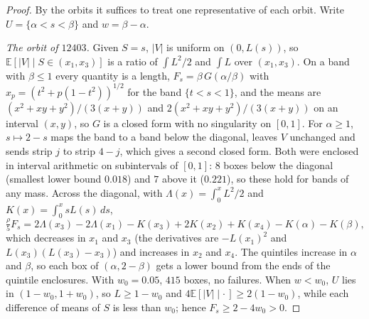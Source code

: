 \documentclass[11pt]{amsart}
\theoremstyle{definition}
\theoremstyle{remark}
\numberwithin{equation}{section}
\newcommand{\E}{\mathbb{E}}
\begin{document}
\begin{proof}
By the orbits it suffices to treat one representative of each orbit. Write $U=\{\alpha<s<\beta\}$ and $w=\beta-\alpha$.

\emph{The orbit of $12403$.} Given $S=s$, $|V|$ is uniform on $(0,L(s))$, so
$\E[|V|\mid S\in(x_1,x_3)]$ is a ratio of $\int L^2/2$ and $\int L$ over $(x_1,x_3)$. On a band with $\beta\le1$ every
quantity is a length, $F_s=\beta\,G(\alpha/\beta)$ with $x_p=(t^2+p(1-t^2))^{1/2}$ for the band $\{t<s<1\}$, and the means
are $(x^2+xy+y^2)/(3(x+y))$ and $2(x^2+xy+y^2)/(3(x+y))$ on an interval $(x,y)$, so $G$ is a closed form with no
singularity on $[0,1]$. For $\alpha\ge1$, $s\mapsto2-s$ maps the band to a band below the diagonal, leaves $V$ unchanged
and sends strip $j$ to strip $4-j$, which gives a second closed form. Both were enclosed in interval arithmetic on
subintervals of $[0,1]$: $8$ boxes below the diagonal (smallest lower bound $0.018$) and $7$ above it ($0.221$), so these
hold for bands of any mass. Across the diagonal, with $\Lambda(x)=\int_0^xL^2/2$ and $K(x)=\int_0^xsL(s)\,ds$,
\[
\tfrac{\rho}{5}F_s=2\Lambda(x_3)-2\Lambda(x_1)-K(x_3)+2K(x_2)+K(x_4)-K(\alpha)-K(\beta),
\]
which decreases in $x_1$ and $x_3$ (the derivatives are $-L(x_1)^2$ and $L(x_3)(L(x_3)-x_3)$) and increases in $x_2$ and
$x_4$. The quintiles increase in $\alpha$ and $\beta$, so each box of $(\alpha,2-\beta)$ gets a lower bound from the ends of
the quintile enclosures. With $w_0=0.05$, $415$ boxes, no failures. When $w<w_0$, $U$ lies in $(1-w_0,1+w_0)$, so
$L\ge1-w_0$ and $4\E[|V|\mid\cdot\,]\ge2(1-w_0)$, while each difference of means of $S$ is less than $w_0$; hence
$F_s\ge2-4w_0>0$.


\end{proof}
\end{document}
